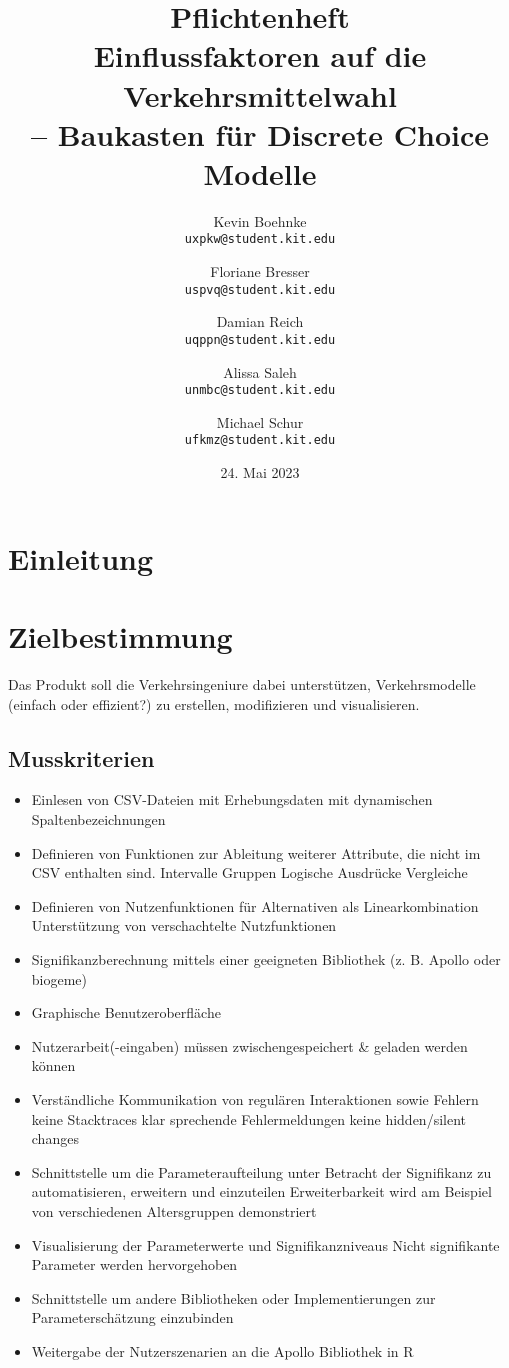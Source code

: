 \documentclass{article}
\title{Pflichtenheft \\ \large Einflussfaktoren auf die Verkehrsmittelwahl\\ -- Baukasten für Discrete Choice Modelle}
\author{Kevin Boehnke \\ \texttt{uxpkw@student.kit.edu}
\and Floriane Bresser \\ \texttt{uspvq@student.kit.edu}
\and Damian Reich \\ \texttt{uqppn@student.kit.edu}
\and Alissa Saleh \\ \texttt{unmbc@student.kit.edu}
\and Michael Schur \\ \texttt{ufkmz@student.kit.edu}}
\date{24. Mai 2023}
\begin{document}
\clearpage\maketitle\thispagestyle{empty}
\newpage
\clearpage\tableofcontents\thispagestyle{empty}
\newpage
{}

\section{Einleitung}

\section{Zielbestimmung}
Das Produkt soll die Verkehrsingeniure dabei unterstützen, Verkehrsmodelle (einfach oder effizient?) zu erstellen, modifizieren und visualisieren.
\subsection{Musskriterien}
\begin{itemize}
    \item Einlesen von CSV-Dateien mit Erhebungsdaten mit dynamischen Spaltenbezeichnungen
    \item Definieren von Funktionen zur Ableitung weiterer Attribute, die nicht im CSV enthalten sind.
        \subitem Intervalle
        \subitem Gruppen
        \subitem Logische Ausdrücke
        \subitem Vergleiche
    \item Definieren von Nutzenfunktionen für Alternativen als Linearkombination
        \subitem Unterstützung von verschachtelte Nutzfunktionen
    \item Signifikanzberechnung mittels einer geeigneten Bibliothek (z. B. Apollo oder biogeme)
    \item Graphische Benutzeroberfläche
    \item Nutzerarbeit(-eingaben) müssen zwischengespeichert \& geladen werden können
    \item Verständliche Kommunikation von regulären Interaktionen sowie Fehlern
        \subitem keine Stacktraces
        \subitem klar sprechende Fehlermeldungen
        \subitem keine hidden/silent changes
    \item Schnittstelle um die Parameteraufteilung unter Betracht der Signifikanz  zu automatisieren, erweitern und einzuteilen
        \subitem Erweiterbarkeit wird am Beispiel von verschiedenen Altersgruppen demonstriert
    \item Visualisierung der Parameterwerte und Signifikanzniveaus
        \subitem Nicht signifikante Parameter werden hervorgehoben
    \item Schnittstelle um andere Bibliotheken oder Implementierungen zur Parameterschätzung einzubinden
    \item Weitergabe der Nutzerszenarien an die Apollo Bibliothek in R
\end{itemize}
\end{document}
